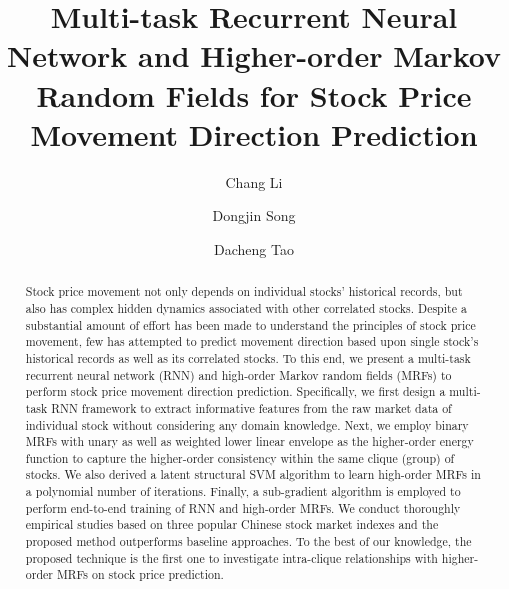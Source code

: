 \documentclass[sigconf]{acmart}
\begin{document}
\title[Multi-task RNN and Higer-order MRFs for Stock Price
Prediction]{Multi-task Recurrent Neural Network and Higher-order
  Markov Random Fields for Stock Price Movement Direction
  Prediction}

\author{Chang Li}

\author{Dongjin Song}

\author{Dacheng Tao}

\renewcommand{\shortauthors}{Li, et al.}

\begin{abstract}
  Stock price movement not only depends on individual stocks'
  historical records, but also has complex hidden dynamics
  associated with other correlated stocks. Despite a substantial
  amount of effort has been made to understand the principles of
  stock price movement, few has attempted to predict movement
  direction based upon single stock's historical records as well
  as its correlated stocks. To this end, we present a multi-task
  recurrent neural network (RNN) and high-order Markov random
  fields (MRFs) to perform stock price movement direction
  prediction. Specifically, we first design a multi-task RNN
  framework to extract informative features from the raw market
  data of individual stock without considering any domain
  knowledge. Next, we employ binary MRFs with unary as well as
  weighted lower linear envelope as the higher-order energy
  function to capture the higher-order consistency within the
  same clique (group) of stocks. We also derived a latent
  structural SVM algorithm to learn high-order MRFs in a
  polynomial number of iterations. Finally, a sub-gradient
  algorithm is employed to perform end-to-end training of RNN and
  high-order MRFs. We conduct thoroughly empirical studies based
  on three popular Chinese stock market indexes and the proposed
  method outperforms baseline approaches. To the best of our
  knowledge, the proposed technique is the first one to
  investigate intra-clique relationships with higher-order MRFs
  on stock price prediction.
\end{abstract}
\end{document}
